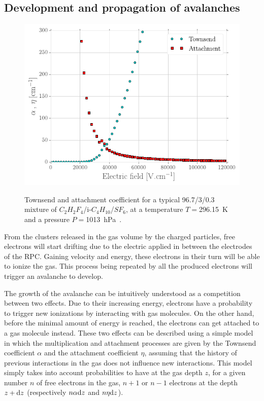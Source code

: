 	\subsection{Development and propagation of avalanches}
	\label{chapt3:ssec:avalanche}
	
\begingroup\setlength{\intextsep}{0pt}\setlength{\columnsep}{15pt}
	
	\begin{figure}
		\centering
		\includegraphics[width = \linewidth]{fig/chapt3/Townsend-RPC.pdf}\\
		\caption{\label{fig:Townsend} Townsend and attachment coefficient for a typical 96.7/3/0.3 mixture of $C_2H_2F_4$/i-$C_4H_{10}$/$SF_6$, at a temperature $T=$\SI{296.15}{K} and a pressure $P=$\SI{1013}{hPa}~\cite{VINCENT2017,RIEGLER2003}.}
	\end{figure}
	
	From the clusters released in the gas volume by the charged particles, free electrons will start drifting due to the electric applied in between the electrodes of the RPC. Gaining velocity and energy, these electrons in their turn will be able to ionize the gas. This process being repeated by all the produced electrons will trigger an avalanche to develop.
	
	The growth of the avalanche can be intuitively understood as a competition between two effects. Due to their increasing energy, electrons have a probability to trigger new ionizations by interacting with gas molecules. On the other hand, before the minimal amount of energy is reached, the electrons can get attached to a gas molecule instead. These two effects can be described using a simple model in which the multiplication and attachment processes are given by the Townsend coefficient $\alpha$ and the attachment coefficient $\eta$, assuming that the history of previous interactions in the gas does not influence new interactions. This model simply takes into account probabilities to have at the gas depth $z$, for a given number $n$ of free electrons in the gas, $n+1$ or $n-1$ electrons at the depth $z+\mathrm{d} z$ (respectively $n\alpha\mathrm{d} z$ and $n\eta\mathrm{d} z$).
	
